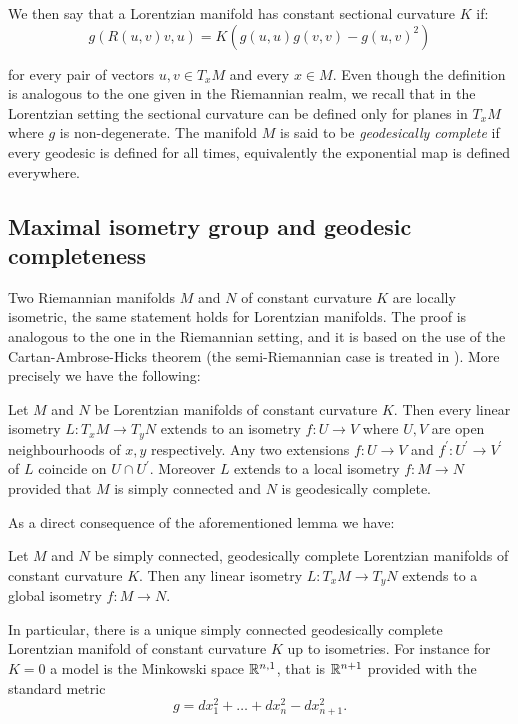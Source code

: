 \noindent We then say that a Lorentzian manifold has constant sectional curvature $K$ if: 
\begin{equation}\label{sectionalcurvature}
    g(R(u,v)v,u)=K(g(u,u)g(v,v)-g(u,v)^2) 
\end{equation}
    


for every pair of vectors $u,v \in T_{x}M$ and every $x\in M$. Even though the definition is analogous to the one given in the Riemannian realm, we recall that in the Lorentzian setting the sectional curvature can be defined only for planes in $T_{x}M$ where $g$ is non-degenerate. The manifold $M$ is said to be \textit{geodesically complete} if every geodesic is defined for all times, equivalently the exponential map is defined everywhere.\\

\subsection{Maximal isometry group and geodesic completeness} Two Riemannian manifolds $M$ and $N$ of constant curvature $K$ are locally isometric, the same statement holds for Lorentzian manifolds. The proof is analogous to the one in the Riemannian setting, and it is based on the use of the Cartan-Ambrose-Hicks theorem (the semi-Riemannian case is treated in \cite{piccione2005single}). More precisely we have the following:

\begin{lemma}\label{isometrie} Let $M$ and $N$ be Lorentzian manifolds of constant curvature $K$. Then every linear isometry $L:T_{x}M\to T_yN$ extends to an isometry $f:U\to V$ where $U, V$ are open neighbourhoods of $x, y$ respectively. Any two extensions $f:U\to V$ and $f^{\prime}:U^{\prime} \to V^{\prime} $ of $L$ coincide on $U\cap U^{\prime}. $ Moreover $L$ extends to a local isometry $f:M\to N$ provided that $M$ is simply connected and $N$ is geodesically complete. 
\end{lemma}

As a direct consequence of the aforementioned lemma we have: 
\begin{corollary}\label{122}
    Let $M$ and $N$ be simply connected, geodesically complete Lorentzian manifolds of constant curvature $K$. Then any linear isometry $L:T_xM\to T_yN$ extends to a global isometry $f:M\to N.$   
\end{corollary}

In particular, there is a unique simply connected geodesically complete Lorentzian manifold of constant curvature $K$ up to isometries. For instance for $K=0$ a model is the Minkowski space $\mathbb{R}^{n,1}$, that is $\mathbb{R}^{n+1}$ provided with the standard metric
\[
    g=dx_1^{2}+\dots+dx_n^{2}-dx_{n+1}^2.   
\]

